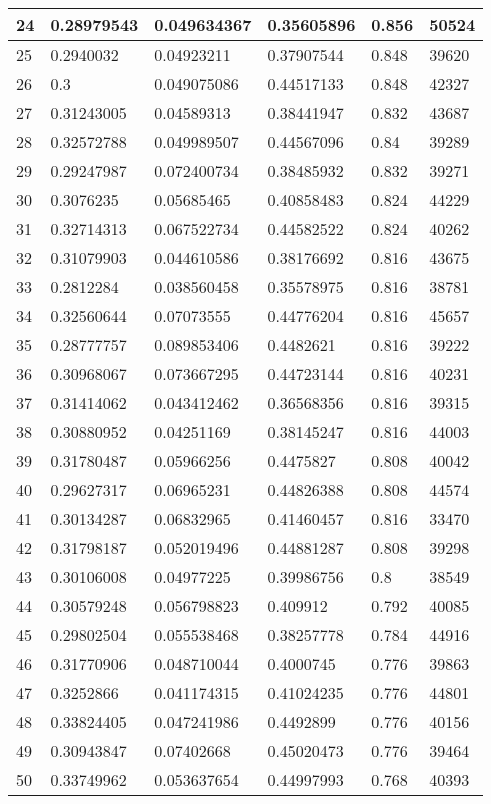 \begin{longtable}{|l|l|l|l|l|l|}
24 & 0.28979543 & 0.049634367 & 0.35605896 & 0.856 & 50524 \\ \hline 
25 & 0.2940032 & 0.04923211 & 0.37907544 & 0.848 & 39620 \\ \hline 
26 & 0.3 & 0.049075086 & 0.44517133 & 0.848 & 42327 \\ \hline 
27 & 0.31243005 & 0.04589313 & 0.38441947 & 0.832 & 43687 \\ \hline 
28 & 0.32572788 & 0.049989507 & 0.44567096 & 0.84 & 39289 \\ \hline 
29 & 0.29247987 & 0.072400734 & 0.38485932 & 0.832 & 39271 \\ \hline 
30 & 0.3076235 & 0.05685465 & 0.40858483 & 0.824 & 44229 \\ \hline 
31 & 0.32714313 & 0.067522734 & 0.44582522 & 0.824 & 40262 \\ \hline 
32 & 0.31079903 & 0.044610586 & 0.38176692 & 0.816 & 43675 \\ \hline 
33 & 0.2812284 & 0.038560458 & 0.35578975 & 0.816 & 38781 \\ \hline 
34 & 0.32560644 & 0.07073555 & 0.44776204 & 0.816 & 45657 \\ \hline 
35 & 0.28777757 & 0.089853406 & 0.4482621 & 0.816 & 39222 \\ \hline 
36 & 0.30968067 & 0.073667295 & 0.44723144 & 0.816 & 40231 \\ \hline 
37 & 0.31414062 & 0.043412462 & 0.36568356 & 0.816 & 39315 \\ \hline 
38 & 0.30880952 & 0.04251169 & 0.38145247 & 0.816 & 44003 \\ \hline 
39 & 0.31780487 & 0.05966256 & 0.4475827 & 0.808 & 40042 \\ \hline 
40 & 0.29627317 & 0.06965231 & 0.44826388 & 0.808 & 44574 \\ \hline 
41 & 0.30134287 & 0.06832965 & 0.41460457 & 0.816 & 33470 \\ \hline 
42 & 0.31798187 & 0.052019496 & 0.44881287 & 0.808 & 39298 \\ \hline 
43 & 0.30106008 & 0.04977225 & 0.39986756 & 0.8 & 38549 \\ \hline 
44 & 0.30579248 & 0.056798823 & 0.409912 & 0.792 & 40085 \\ \hline 
45 & 0.29802504 & 0.055538468 & 0.38257778 & 0.784 & 44916 \\ \hline 
46 & 0.31770906 & 0.048710044 & 0.4000745 & 0.776 & 39863 \\ \hline 
47 & 0.3252866 & 0.041174315 & 0.41024235 & 0.776 & 44801 \\ \hline 
48 & 0.33824405 & 0.047241986 & 0.4492899 & 0.776 & 40156 \\ \hline 
49 & 0.30943847 & 0.07402668 & 0.45020473 & 0.776 & 39464 \\ \hline 
50 & 0.33749962 & 0.053637654 & 0.44997993 & 0.768 & 40393 \\ \hline 
\end{longtable}